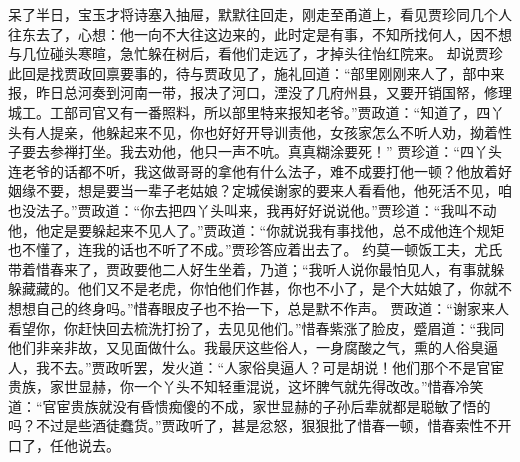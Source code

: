 \documentclass[12pt,oneside]{book}
\begin{document}
呆了半日，宝玉才将诗塞入抽屉，默默往回走，刚走至甬道上，看见贾珍同几个人往东去了，心想：他一向不大往这边来的，此时定是有事，不知所找何人，因不想与几位碰头寒暄，急忙躲在树后，看他们走远了，才掉头往怡红院来。
却说贾珍此回是找贾政回禀要事的，待与贾政见了，施礼回道：“部里刚刚来人了，部中来报，昨日总河奏到河南一带，报决了河口，湮没了几府州县，又要开销国帑，修理城工。工部司官又有一番照料，所以部里特来报知老爷。”贾政道：“知道了，四丫头有人提亲，他躲起来不见，你也好好开导训责他，女孩家怎么不听人劝，拗着性子要去参禅打坐。我去劝他，他只一声不吭。真真糊涂要死！”
贾珍道：“四丫头连老爷的话都不听，我这做哥哥的拿他有什么法子，难不成要打他一顿？他放着好姻缘不要，想是要当一辈子老姑娘？定城侯谢家的要来人看看他，他死活不见，咱也没法子。”贾政道：“你去把四丫头叫来，我再好好说说他。”贾珍道：“我叫不动他，他定是要躲起来不见人了。”贾政道：“你就说我有事找他，总不成他连个规矩也不懂了，连我的话也不听了不成。”贾珍答应着出去了。
约莫一顿饭工夫，尤氏带着惜春来了，贾政要他二人好生坐着，乃道；“我听人说你最怕见人，有事就躲躲藏藏的。他们又不是老虎，你怕他们作甚，你也不小了，是个大姑娘了，你就不想想自己的终身吗。”惜春眼皮子也不抬一下，总是默不作声。
贾政道：“谢家来人看望你，你赶快回去梳洗打扮了，去见见他们。”惜春紫涨了脸皮，蹙眉道：“我同他们非亲非故，又见面做什么。我最厌这些俗人，一身腐酸之气，熏的人俗臭逼人，我不去。”贾政听罢，发火道：“人家俗臭逼人？可是胡说！他们那个不是官宦贵族，家世显赫，你一个丫头不知轻重混说，这坏脾气就先得改改。”惜春冷笑道：“官宦贵族就没有昏愦痴傻的不成，家世显赫的子孙后辈就都是聪敏了悟的吗？不过是些酒徒蠢货。”贾政听了，甚是忿怒，狠狠批了惜春一顿，惜春索性不开口了，任他说去。
\end{document}
